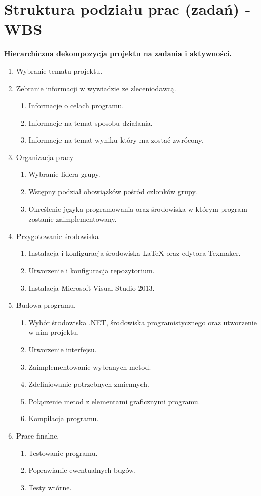 \section{Struktura podziału prac (zadań) - WBS}
\textbf{Hierarchiczna dekompozycja projektu na zadania i aktywności.}
\begin{enumerate}
\item{Wybranie tematu projektu.}
\item Zebranie informacji w wywiadzie ze zleceniodawcą.
\begin{enumerate}
\item Informacje o celach programu.
\item Informacje na temat sposobu działania.
\item Informacje na temat wyniku który ma zostać zwrócony. 
\end{enumerate}
\item{Organizacja pracy}
\begin{enumerate}
\item Wybranie lidera grupy.
\item Wstępny podział obowiązków pośród członków grupy.
\item Określenie języka programowania oraz środowiska w którym program zostanie zaimplementowany.
\end{enumerate}
\item Przygotowanie środowiska
\begin{enumerate}
\item Instalacja i konfiguracja środowiska LaTeX oraz edytora Texmaker.
\item Utworzenie i konfiguracja repozytorium.
\item Instalacja Microsoft Visual Studio 2013.
\end{enumerate}
\item Budowa programu.
\begin{enumerate}
\item Wybór środowiska .NET, środowiska programistycznego oraz utworzenie w nim projektu.
\item Utworzenie interfejsu.
\item Zaimplementowanie wybranych metod.
\item Zdefiniowanie potrzebnych zmiennych.
\item Połączenie metod z elementami graficznymi programu.
\item Kompilacja programu.
\end{enumerate} 
\item Prace finalne.
\begin{enumerate}
\item Testowanie programu.
\item Poprawianie ewentualnych bugów.
\item Testy wtórne.
\end{enumerate}

\end{enumerate}



